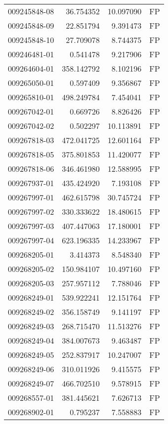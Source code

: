 \begin{tabular}{lrrl}
009245848-08 &   36.754352 &    10.097090 &   FP \\
009245848-09 &   22.851794 &     9.391473 &   FP \\
009245848-10 &   27.709078 &     8.744375 &   FP \\
009246481-01 &    0.541478 &     9.217906 &   FP \\
009264604-01 &  358.142792 &     8.102196 &   FP \\
009265050-01 &    0.597409 &     9.356867 &   FP \\
009265810-01 &  498.249784 &     7.454041 &   FP \\
009267042-01 &    0.669726 &     8.826426 &   FP \\
009267042-02 &    0.502297 &    10.113891 &   FP \\
009267818-03 &  472.041725 &    12.601164 &   FP \\
009267818-05 &  375.801853 &    11.420077 &   FP \\
009267818-06 &  346.461980 &    12.588995 &   FP \\
009267937-01 &  435.424920 &     7.193108 &   FP \\
009267997-01 &  462.615798 &    30.745724 &   FP \\
009267997-02 &  330.333622 &    18.480615 &   FP \\
009267997-03 &  407.447063 &    17.180001 &   FP \\
009267997-04 &  623.196335 &    14.233967 &   FP \\
009268205-01 &    3.414373 &     8.548340 &   FP \\
009268205-02 &  150.984107 &    10.497160 &   FP \\
009268205-03 &  257.957112 &     7.788046 &   FP \\
009268249-01 &  539.922241 &    12.151764 &   FP \\
009268249-02 &  356.158749 &     9.141197 &   FP \\
009268249-03 &  268.715470 &    11.513276 &   FP \\
009268249-04 &  384.007673 &     9.463487 &   FP \\
009268249-05 &  252.837917 &    10.247007 &   FP \\
009268249-06 &  310.011926 &     9.415575 &   FP \\
009268249-07 &  466.702510 &     9.578915 &   FP \\
009268557-01 &  381.445621 &     7.626713 &   FP \\
009268902-01 &    0.795237 &     7.558883 &   FP \\

\end{tabular}
